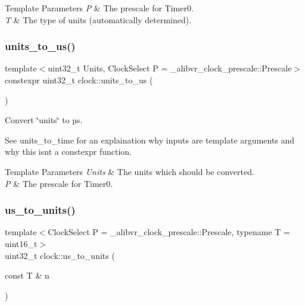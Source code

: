 \begin{DoxyTemplParams}{Template Parameters}
{\em P} & The prescale for {\ttfamily Timer0}. \\
\hline
{\em T} & The type of units (automatically determined). \\
\hline
\end{DoxyTemplParams}
\hypertarget{namespaceclock_a320b3614df868e901b2f022f70a3d8ae}{}\label{namespaceclock_a320b3614df868e901b2f022f70a3d8ae} 
\subsubsection{\texorpdfstring{units\+\_\+to\+\_\+us()}{units\_to\_us()}\hspace{0.1cm}{\footnotesize\ttfamily [2/2]}}
{\footnotesize\ttfamily template$<$uint32\+\_\+t Units, Clock\+Select P = \+\_\+alibvr\+\_\+clock\+\_\+prescale\+::\+Prescale$>$ \\
constexpr uint32\+\_\+t clock\+::units\+\_\+to\+\_\+us (\begin{DoxyParamCaption}{ }\end{DoxyParamCaption})\hspace{0.3cm}{\ttfamily [inline]}}



Convert \char`\"{}units\char`\"{} to µs. 

See units\+\_\+to\+\_\+time for an explaination why inputs are template arguments and why this isn\textquotesingle{}t a constexpr function.


\begin{DoxyTemplParams}{Template Parameters}
{\em Units} & The units which should be converted. \\
\hline
{\em P} & The prescale for {\ttfamily Timer0}. \\
\hline
\end{DoxyTemplParams}
\hypertarget{namespaceclock_ac07c7dca2d34cd417aa968fa2ccab83b}{}\label{namespaceclock_ac07c7dca2d34cd417aa968fa2ccab83b} 
\subsubsection{\texorpdfstring{us\+\_\+to\+\_\+units()}{us\_to\_units()}\hspace{0.1cm}{\footnotesize\ttfamily [1/2]}}
{\footnotesize\ttfamily template$<$Clock\+Select P = \+\_\+alibvr\+\_\+clock\+\_\+prescale\+::\+Prescale, typename T  = uint16\+\_\+t$>$ \\
uint32\+\_\+t clock\+::us\+\_\+to\+\_\+units (\begin{DoxyParamCaption}\item[{const T \&}]{n }\end{DoxyParamCaption})\hspace{0.3cm}{\ttfamily [inline]}}



